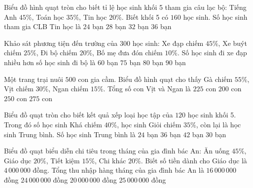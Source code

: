 \begin{ex} %
Biểu đồ hình quạt tròn cho biết tỉ lệ học sinh khối 5 tham gia câu lạc bộ: Tiếng Anh $45\%$, Toán học $35\%$, Tin học $20\%$. Biết khối 5 có $160$ học sinh. Số học sinh tham gia CLB Tin học là
\choice
{$24$ bạn}
{$28$ bạn}
{\True $32$ bạn}
{$36$ bạn}
\end{ex}

\begin{ex} %
Khảo sát phương tiện đến trường của $300$ học sinh: Xe đạp chiếm $45\%$, Xe buýt chiếm $25\%$, Đi bộ chiếm $20\%$, Bố mẹ đưa đón chiếm $10\%$. Số học sinh đi xe đạp nhiều hơn số học sinh đi bộ là
\choice
{$60$ bạn}
{\True $75$ bạn}
{$80$ bạn}
{$90$ bạn}
\end{ex}

\begin{ex} %
Một trang trại nuôi $500$ con gia cầm. Biểu đồ hình quạt cho thấy Gà chiếm $55\%$, Vịt chiếm $30\%$, Ngan chiếm $15\%$. Tổng số con Vịt và Ngan là
\choice
{\True $225$ con}
{$200$ con}
{$250$ con}
{$275$ con}
\end{ex}

\begin{ex} %
Biểu đồ quạt tròn cho biết kết quả xếp loại học tập của $120$ học sinh khối 5. Trong đó số học sinh Khá chiếm $40\%$, học sinh Giỏi chiếm $35\%$, còn lại là học sinh Trung bình. Số học sinh Trung bình là
\choice
{$24$ bạn}
{$36$ bạn}
{$42$ bạn}
{\True $30$ bạn}
\end{ex}

\begin{ex} %
Biểu đồ quạt biểu diễn chi tiêu trong tháng của gia đình bác An: Ăn uống $45\%$, Giáo dục $20\%$, Tiết kiệm $15\%$, Chi khác $20\%$. Biết số tiền dành cho Giáo dục là $4\,000\,000$ đồng. Tổng thu nhập hàng tháng của gia đình bác An là
\choice
{$16\,000\,000$ đồng}
{$24\,000\,000$ đồng}
{\True $20\,000\,000$ đồng}
{$25\,000\,000$ đồng}
\end{ex}

